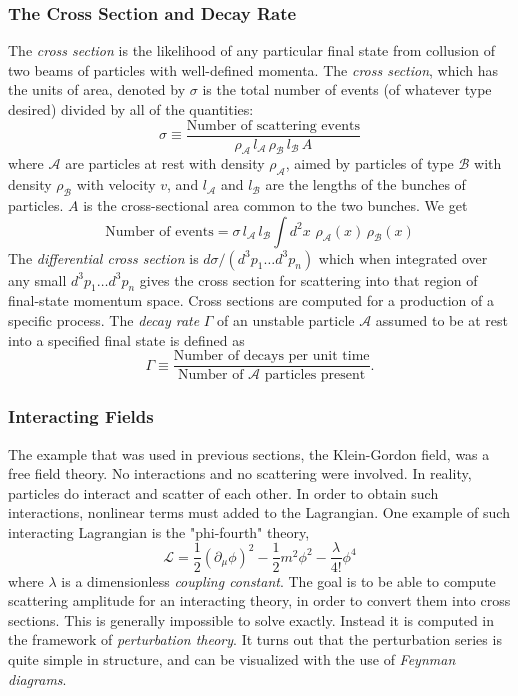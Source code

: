 \subsubsection{The Cross Section and Decay Rate}

The \emph{cross section} is the likelihood of any particular final state from collusion of two beams of particles with well-defined momenta. The \emph{cross section}, which has the units of area, denoted by $\sigma$ is the total number of events (of whatever type desired) divided by all of the quantities:
\begin{equation}
\sigma \equiv \frac{\text{Number of scattering events}}{\rho_\mathcal{A}\,l_\mathcal{A}\,\rho_\mathcal{B}\,l_\mathcal{B}\,A}
\end{equation}
where $\mathcal{A}$ are particles at rest with density $\rho_\mathcal{A}$, aimed by particles of type $\mathcal{B}$ with density $\rho_\mathcal{B}$ with velocity $v$, and $l_\mathcal{A}$ and $l_\mathcal{B}$ are the lengths of the bunches of particles. $A$ is the cross-sectional area common to the two bunches. We get
\begin{equation}
\text{Number of events} = \sigma\,l_\mathcal{A}\,l_\mathcal{B}\int d^2 x\,\, \rho_\mathcal{A}(x)\,\rho_\mathcal{B}(x)
\end{equation}
The \emph{differential cross section} is $d\sigma/(d^3 p_1\ldots d^3p_n)$ which when integrated over any small $d^3 p_1\ldots d^3p_n$ gives the cross section for scattering into that region of final-state momentum space. Cross sections are computed for a production of a specific process. The \emph{decay rate} $\Gamma$ of an unstable particle $\mathcal{A}$ assumed to be at rest into a specified final state is defined as
\begin{equation}
\Gamma \equiv \frac{\text{Number of decays per unit time}}{\text{Number of $\mathcal{A}$ particles present}}.
\end{equation}

\subsubsection{Interacting Fields}

The example that was used in previous sections, the Klein-Gordon field, was a free field theory. No interactions and no scattering were involved. In reality, particles do interact and scatter of each other. In order to obtain such interactions, nonlinear terms must added to the Lagrangian. One example of such interacting Lagrangian is the "phi-fourth" theory,
\begin{equation}
\mathcal{L} = \frac{1}{2}(\partial_\mu\phi)^2-\frac{1}{2}m^2\phi^2 -\frac{\lambda}{4!}\phi^4
\end{equation}
where $\lambda$ is a dimensionless \emph{coupling constant}. The goal is to be able to compute scattering amplitude for an interacting theory, in order to convert them into cross sections. This is generally impossible to solve exactly. Instead it is computed in the framework of \emph{perturbation theory}. It turns out that the perturbation series is quite simple in structure, and can be visualized with the use of \emph{Feynman diagrams}.

